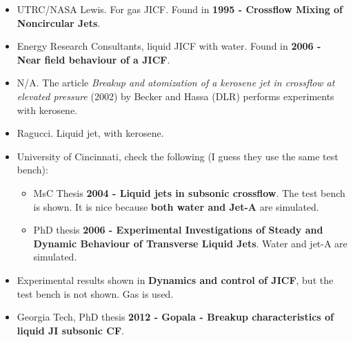 \begin{itemize}

\item UTRC/NASA Lewis. For gas JICF. Found in  \textbf{1995 - Crossflow Mixing of Noncircular Jets}.

\item Energy Research Consultants, liquid JICF with water. Found in \textbf{2006 - Near field behaviour of a JICF}.

\item N/A. The article \textsl{Breakup and atomization of a kerosene jet in crossflow at elevated pressure} (2002) by Becker and Hassa (DLR) performs experiments with kerosene.

\item Ragucci. Liquid jet, with kerosene.

\item University of Cincinnati, check the following (I guess they use the same test bench):

 \begin{itemize}
 
    \item MsC Thesis \textbf{2004 - Liquid jets in subsonic crossflow}. The test bench is shown. It is nice because \textbf{both water and Jet-A} are simulated.
    
    \item PhD thesis \textbf{2006 - Experimental Investigations of Steady and Dynamic Behaviour of Transverse Liquid Jets}. Water and jet-A are simulated.
 
 \end{itemize}

\item Experimental results shown in \textbf{Dynamics and control of JICF}, but the test bench is not shown. Gas is used.

\item Georgia Tech, PhD thesis \textbf{2012 - Gopala - Breakup characteristics of liquid JI subsonic CF}.

\end{itemize}